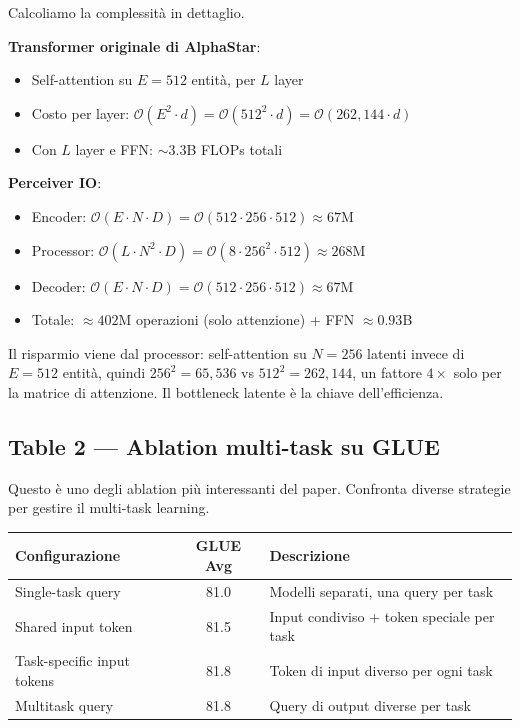 \documentclass[12pt,a4paper]{article}
\begin{document}
\begin{examplebox}
Calcoliamo la complessit\`a in dettaglio.

\textbf{Transformer originale di AlphaStar}:
\begin{itemize}
    \item Self-attention su $E = 512$ entit\`a, per $L$ layer
    \item Costo per layer: $\mathcal{O}(E^2 \cdot d) = \mathcal{O}(512^2 \cdot d) = \mathcal{O}(262{,}144 \cdot d)$
    \item Con $L$ layer e FFN: $\sim 3.3$B FLOPs totali
\end{itemize}

\textbf{Perceiver IO}:
\begin{itemize}
    \item Encoder: $\mathcal{O}(E \cdot N \cdot D) = \mathcal{O}(512 \cdot 256 \cdot 512) \approx 67$M
    \item Processor: $\mathcal{O}(L \cdot N^2 \cdot D) = \mathcal{O}(8 \cdot 256^2 \cdot 512) \approx 268$M
    \item Decoder: $\mathcal{O}(E \cdot N \cdot D) = \mathcal{O}(512 \cdot 256 \cdot 512) \approx 67$M
    \item Totale: $\approx 402$M operazioni (solo attenzione) + FFN $\approx 0.93$B
\end{itemize}

Il risparmio viene dal processor: self-attention su $N = 256$ latenti invece di $E = 512$ entit\`a, quindi $256^2 = 65{,}536$ vs $512^2 = 262{,}144$, un fattore $4\times$ solo per la matrice di attenzione. Il bottleneck latente \`e la chiave dell'efficienza.
\end{examplebox}

\subsection{Table 2 --- Ablation multi-task su GLUE}

Questo \`e uno degli ablation pi\`u interessanti del paper. Confronta diverse strategie per gestire il multi-task learning.

\begin{center}
\begin{tabular}{p{5cm}cp{5.5cm}}
\toprule
\textbf{Configurazione} & \textbf{GLUE Avg} & \textbf{Descrizione} \\
\midrule
Single-task query & 81.0 & Modelli separati, una query per task \\
Shared input token & 81.5 & Input condiviso + token speciale per task \\
Task-specific input tokens & 81.8 & Token di input diverso per ogni task \\
Multitask query & 81.8 & Query di output diverse per task \\
\bottomrule
\end{tabular}
\end{center}
\end{document}

